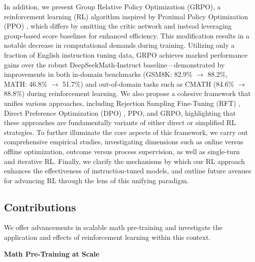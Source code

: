 In addition, we present Group Relative Policy Optimization (GRPO), a reinforcement learning (RL) algorithm inspired by Proximal Policy Optimization (PPO) \citep{schulman2017proximal}, which differs by omitting the critic network and instead leveraging group-based score baselines for enhanced efficiency. This modification results in a notable decrease in computational demands during training. Utilizing only a fraction of English instruction tuning data, GRPO achieves marked performance gains over the robust DeepSeekMath-Instruct baseline—demonstrated by improvements in both in-domain benchmarks (GSM8K: 82.9\% $\rightarrow$ 88.2\%, MATH: 46.8\% $\rightarrow$ 51.7\%) and out-of-domain tasks such as CMATH (84.6\% $\rightarrow$ 88.8\%) during reinforcement learning. We also propose a cohesive framework that unifies various approaches, including Rejection Sampling Fine-Tuning (RFT) \citep{yuan2023scaling}, Direct Preference Optimization (DPO) \citep{dpo}, PPO, and GRPO, highlighting that these approaches are fundamentally variants of either direct or simplified RL strategies. To further illuminate the core aspects of this framework, we carry out comprehensive empirical studies, investigating dimensions such as online versus offline optimization, outcome versus process supervision, as well as single-turn and iterative RL. Finally, we clarify the mechanisms by which our RL approach enhances the effectiveness of instruction-tuned models, and outline future avenues for advancing RL through the lens of this unifying paradigm.

\subsection{Contributions}
We offer advancements in scalable math pre-training and investigate the application and effects of reinforcement learning within this context.

\textbf{Math Pre-Training at Scale}

